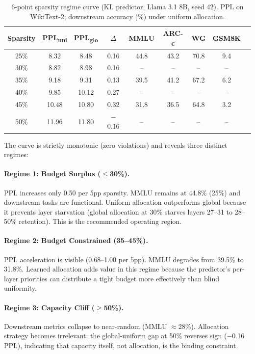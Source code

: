 \documentclass[11pt,a4paper]{article}
\begin{document}
\begin{table}[h]
\centering
\small
\caption{6-point sparsity regime curve (KL predictor, Llama 3.1 8B, seed 42). PPL on WikiText-2; downstream accuracy (\%) under uniform allocation.}
\label{tab:regime}
\begin{tabular}{ccccccccc}
\toprule
\textbf{Sparsity} & \textbf{PPL\textsubscript{uni}} & \textbf{PPL\textsubscript{glo}} & $\Delta$ & \textbf{MMLU} & \textbf{ARC-c} & \textbf{WG} & \textbf{GSM8K} \\
\midrule
25\% & 8.32 & 8.48 & 0.16 & 44.8 & 43.2 & 70.8 & 9.4 \\
30\% & 8.82 & 8.98 & 0.16 & -- & -- & -- & -- \\
35\% & 9.18 & 9.31 & 0.13 & 39.5 & 41.2 & 67.2 & 6.2 \\
40\% & 9.85 & 10.12 & 0.27 & -- & -- & -- & -- \\
45\% & 10.48 & 10.80 & 0.32 & 31.8 & 36.5 & 64.8 & 3.2 \\
50\% & 11.96 & 11.80 & $-$0.16 & -- & -- & -- & -- \\
\bottomrule
\end{tabular}
\end{table}

The curve is strictly monotonic (zero violations) and reveals three distinct regimes:

\paragraph{Regime 1: Budget Surplus ($\leq$30\%).}
PPL increases only 0.50 per 5pp sparsity.
MMLU remains at 44.8\% (25\%) and downstream tasks are functional.
Uniform allocation outperforms global because it prevents layer starvation (global allocation at 30\% starves layers 27--31 to 28--50\% retention).
This is the recommended operating region.

\paragraph{Regime 2: Budget Constrained (35--45\%).}
PPL acceleration is visible (0.68--1.00 per 5pp).
MMLU degrades from 39.5\% to 31.8\%.
Learned allocation adds value in this regime because the predictor's per-layer priorities can distribute a tight budget more effectively than blind uniformity.

\paragraph{Regime 3: Capacity Cliff ($\geq$50\%).}
Downstream metrics collapse to near-random (MMLU $\approx$28\%).
Allocation strategy becomes irrelevant: the global-uniform gap at 50\% reverses sign ($-$0.16 PPL), indicating that capacity itself, not allocation, is the binding constraint.
\end{document}
